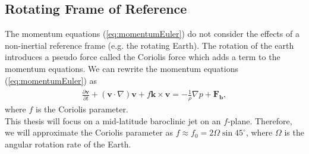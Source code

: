\subsection{Rotating Frame of Reference}
\label{sec:coriolis}
The momentum equations (\ref{eq:momentumEuler}) do not consider the effects of a non-inertial reference frame (e.g. the rotating Earth). The rotation of the earth introduces a pseudo force called the Coriolis force which adds a term to the momentum equations. We can rewrite the momentum equations (\ref{eq:momentumEuler}) as
\begin{align}
\frac{\partial \mathbf{v}}{\partial t} + (\mathbf{v} \cdot \nabla)\mathbf{v} + f \mathbf{\hat{k}} \times \mathbf{v}                                                                                                                                                                                                                                                                                                                                                                                                                                                                                                                                                                                                                                                                                                                                                                                                                                                                                                                                                                                                                                                                                                                                                                                                                                                                                                                                                                                                                                                            = -\frac{1}{\rho} \nabla p  + \mathbf{F_b}, \label{eq:momentum}
\end{align}
where $f$ is the Coriolis parameter.\\

This thesis will focus on a mid-latitude baroclinic jet on an $f$-plane. Therefore, we will approximate the Coriolis parameter as $f \approx f_0 = 2\Omega \sin{45^\circ}$, where $\Omega$ is the angular rotation rate of the Earth.

